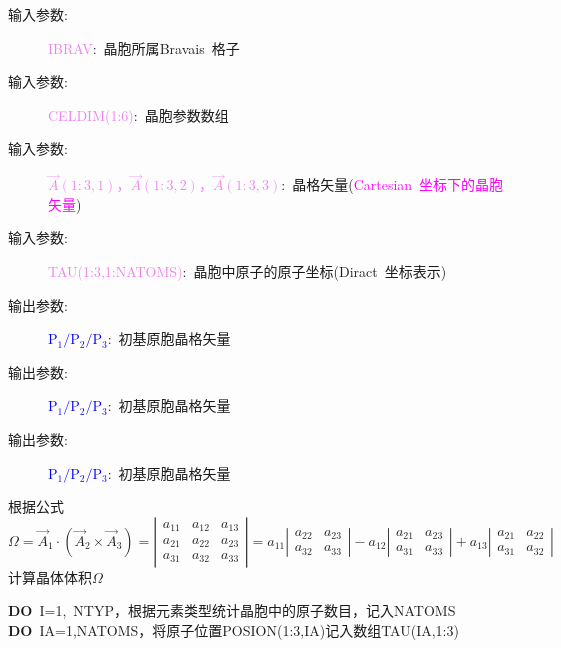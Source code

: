 \documentclass{article}      %
\begin{document}
\vskip 30pt
\begin{description}
	\item[输入参数:~]\textcolor{violet}{\textrm{IBRAV}}:~晶胞所属\textrm{Bravais~}格子
	\item[输入参数:~]\textcolor{violet}{\textrm{CELDIM(1:6)}}:~晶胞参数数组
	\item[输入参数:~]\textcolor{violet}{$\vec A(1:3,1)$，$\vec A(1:3,2)$，$\vec A(1:3,3)$}:~晶格矢量(\textcolor{magenta}{\textrm{Cartesian~}坐标下的晶胞矢量})
	\item[输入参数:~]\textcolor{violet}{\textrm{TAU(1:3,1:NATOMS)}}:~晶胞中原子的原子坐标(\textrm{Diract~}坐标表示)
	\item[输出参数:~]\textcolor{blue}{$\mathrm{P}_1/\mathrm{P}_2/\mathrm{P}_3$}:~初基原胞晶格矢量
	\item[输出参数:~]\textcolor{blue}{$\mathrm{P}_1/\mathrm{P}_2/\mathrm{P}_3$}:~初基原胞晶格矢量
	\item[输出参数:~]\textcolor{blue}{$\mathrm{P}_1/\mathrm{P}_2/\mathrm{P}_3$}:~初基原胞晶格矢量
\end{description}
根据公式
\begin{displaymath}
	\Omega=\vec A_1\cdot(\vec A_2\times\vec A_3)=\left|
	\begin{matrix}
		a_{11} &a_{12} &a_{13}\\
		a_{21} &a_{22} &a_{23}\\
		a_{31} &a_{32} &a_{33}
	\end{matrix}
	\right|=a_{11}\left|
	\begin{matrix}
		a_{22} &a_{23}\\
		a_{32} &a_{33}
	\end{matrix}
	\right|-a_{12}\left|
	\begin{matrix}
		a_{21} &a_{23}\\
		a_{31} &a_{33}
	\end{matrix}
	\right|+a_{13}\left|
	\begin{matrix}
		a_{21} &a_{22}\\
		a_{31} &a_{32}
	\end{matrix}
	\right|
\end{displaymath}
计算晶体体积$\Omega$

\vskip 50pt
\noindent\textbf{DO}~\textrm{I}=1,~\textrm{NTYP}，根据元素类型统计晶胞中的原子数目，记入\textrm{NATOMS}\\
\textbf{DO}~\textrm{IA}=1,\textrm{NATOMS}，将原子位置\textrm{POSION}(1:3,IA)记入数组\textrm{TAU(IA,1:3)}
\end{document}
